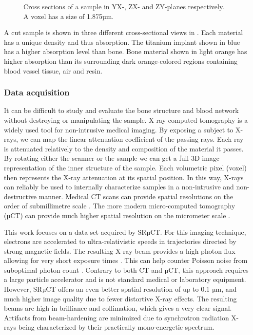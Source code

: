 \begin{figure}
\begin{tabular}{cc}
  \end{tabular}
  \caption{
    Cross sections of a sample in YX-, ZX- and ZY-planes respectively. A voxel
    has a size of 1.875µm.
  }
\label{fig:3viewsample}
\end{figure}

A cut sample is shown in three different cross-sectional views in
. Each material has a unique density and thus absorption.
The titanium implant shown in blue has a higher absorption level than bone.
Bone material shown in light orange has higher absorption than its surrounding
dark orange-colored regions containing blood vessel tissue, air and resin.

\subsubsection{Data acquisition}

It can be difficult to study and evaluate the bone structure and blood network
without destroying or manipulating the sample. X-ray computed tomography is a
widely used tool for non-intrusive medical imaging. By exposing a subject to
X-rays, we can map the linear attenuation coefficient of the passing rays. Each
ray is attenuated relatively to the density and composition of the material it
passes. By rotating either the scanner or the sample we can get a full 3D image
representation of the inner structure of the sample. Each volumetric pixel
(voxel) then represents the X-ray attenuation at its spatial position. In this
way, X-rays can reliably be used to internally characterize samples in a
non-intrusive and non-destructive manner. Medical CT scans can provide spatial
resolutions on the order of submillimetre scale \citep{medicalct}. The more
modern micro-computed tomography (µCT) can provide much higher spatial
resolution on the micrometer scale \citep{srexptime}.

This work focuses on a data set acquired by SRµCT. For this imaging technique,
electrons are accelerated to ultra-relativistic speeds in trajectories directed
by strong magnetic fields. The resulting X-ray beam provides a high photon flux
allowing for very short exposure times \citep{srexptime}. This can help counter
Poisson noise from suboptimal photon count \citep{srnoise}. Contrary to both CT
and µCT, this approach requires a large particle accelerator and is not
standard medical or laboratory equipment. However, SRµCT offers an even better
spatial resolution of up to 0.1 µm, and much higher image quality due to fewer
distortive X-ray effects. The resulting beams are high in brilliance and
collimation, which gives a very clear signal. Artifacts from beam-hardening are
minimized due to synchrotron radiation X-rays being characterized by their
practically mono-energetic spectrum.

